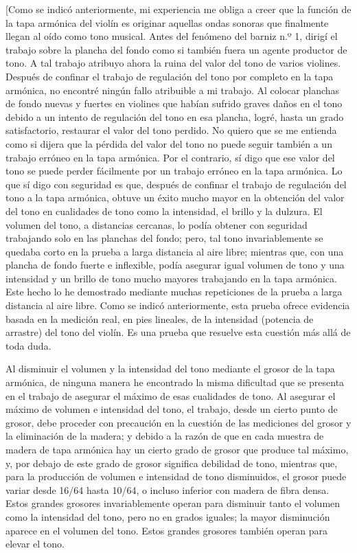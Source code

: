 \documentclass[12pt]{book}
\begin{document}
[Como se indicó anteriormente, mi experiencia me obliga a creer que la función de la tapa armónica del violín es originar aquellas ondas sonoras que finalmente llegan al oído como tono musical. Antes del fenómeno del barniz n.º 1, dirigí el trabajo sobre la plancha del fondo como si también fuera un agente productor de tono. A tal trabajo atribuyo ahora la ruina del valor del tono de varios violines. Después de confinar el trabajo de regulación del tono por completo en la tapa armónica, no encontré ningún fallo atribuible a mi trabajo. Al colocar planchas de fondo nuevas y fuertes en violines que habían sufrido graves daños en el tono debido a un intento de regulación del tono en esa plancha, logré, hasta un grado satisfactorio, restaurar el valor del tono perdido. No quiero que se me entienda como si dijera que la pérdida del valor del tono no puede seguir también a un trabajo erróneo en la tapa armónica. Por el contrario, sí digo que ese valor del tono se puede perder fácilmente por un trabajo erróneo en la tapa armónica. Lo que sí digo con seguridad es que, después de confinar el trabajo de regulación del tono a la tapa armónica, obtuve un éxito mucho mayor en la obtención del valor del tono en cualidades de tono como la intensidad, el brillo y la dulzura. El volumen del tono, a distancias cercanas, lo podía obtener con seguridad trabajando solo en las planchas del fondo; pero, tal tono invariablemente se quedaba corto en la prueba a larga distancia al aire libre; mientras que, con una plancha de fondo fuerte e inflexible, podía asegurar igual volumen de tono y una intensidad y un brillo de tono mucho mayores trabajando en la tapa armónica. Este hecho lo he demostrado mediante muchas repeticiones de la prueba a larga distancia al aire libre. Como se indicó anteriormente, esta prueba ofrece evidencia basada en la medición real, en pies lineales, de la intensidad (potencia de arrastre) del tono del violín. Es una prueba que resuelve esta cuestión más allá de toda duda.

Al disminuir el volumen y la intensidad del tono mediante el grosor de la tapa armónica, de ninguna manera he encontrado la misma dificultad que se presenta en el trabajo de asegurar el máximo de esas cualidades de tono. Al asegurar el máximo de volumen e intensidad del tono, el trabajo, desde un cierto punto de grosor, debe proceder con precaución en la cuestión de las mediciones del grosor y la eliminación de la madera; y debido a la razón de que en cada muestra de madera de tapa armónica hay un cierto grado de grosor que produce tal máximo, y, por debajo de este grado de grosor significa debilidad de tono, mientras que, para la producción de volumen e intensidad de tono disminuidos, el grosor puede variar desde 16/64 hasta 10/64, o incluso inferior con madera de fibra densa. Estos grandes grosores invariablemente operan para disminuir tanto el volumen como la intensidad del tono, pero no en grados iguales; la mayor disminución aparece en el volumen del tono. Estos grandes grosores también operan para elevar el tono.
\end{document}
